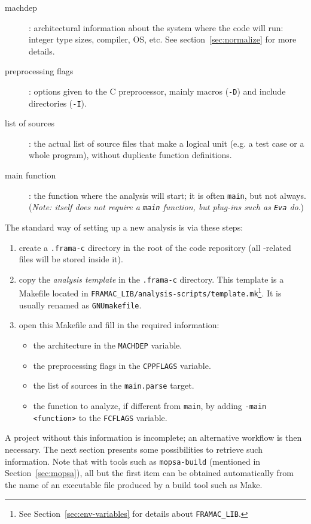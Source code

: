 \begin{description}
\item[machdep]: architectural information about the system where the code will
  run: integer type sizes, compiler, OS, etc.
  See section~\ref{sec:normalize} for more details.
\item[preprocessing flags]: options given to the C preprocessor, mainly
  macros (\texttt{-D}) and include directories (\texttt{-I}).
\item[list of sources]: the actual list of source files that make a logical
  unit (e.g. a test case or a whole program), without duplicate function
  definitions.
\item[main function]: the function where the analysis will start; it is often
  \texttt{main}, but not always. ({\em Note: \FramaC itself does not require
    a \texttt{main} function, but plug-ins such as \texttt{Eva} do}.)
\end{description}

The standard way of setting up a new analysis is via these steps:

\begin{enumerate}
\item create a \texttt{.frama-c} directory in the root of the code repository
  (all \FramaC-related files will be stored inside it).
\item copy the {\em analysis template} in the \texttt{.frama-c} directory.
  This template is a Makefile located in
  \texttt{FRAMAC\_LIB/analysis-scripts/template.mk}\footnote{See
  Section~\ref{sec:env-variables} for details about \texttt{FRAMAC\_LIB}.}.
  It is usually renamed as \texttt{GNUmakefile}.
\item open this Makefile and fill in the required information:
  \begin{itemize}
    \item the architecture in the \texttt{MACHDEP} variable.
    \item the preprocessing flags in the \texttt{CPPFLAGS} variable.
    \item the list of sources in the \texttt{main.parse} target.
    \item the function to analyze, if different from \texttt{main}, by
    adding \texttt{-main <function>} to the \texttt{FCFLAGS} variable.
  \end{itemize}
\end{enumerate}

A project without this information is incomplete; an alternative
workflow is then necessary. The next section presents some possibilities to
retrieve such information. Note that with tools such as
\texttt{mopsa-build} (mentioned in Section~\ref{sec:mopsa}), all but the first
item can be obtained automatically from the name of an executable file produced
by a build tool such as Make.

